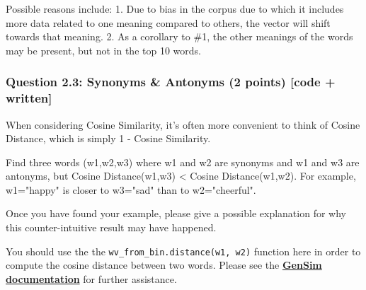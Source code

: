 \documentclass[11pt]{article}
\begin{document}
Possible reasons include: 1. Due to bias in the corpus due to which it
includes more data related to one meaning compared to others, the vector
will shift towards that meaning. 2. As a corollary to \#1, the other
meanings of the words may be present, but not in the top 10 words.

    \subsubsection{Question 2.3: Synonyms \& Antonyms (2 points) {[}code +
written{]}}\label{question-2.3-synonyms-antonyms-2-points-code-written}

When considering Cosine Similarity, it's often more convenient to think
of Cosine Distance, which is simply 1 - Cosine Similarity.

Find three words (w1,w2,w3) where w1 and w2 are synonyms and w1 and w3
are antonyms, but Cosine Distance(w1,w3) \textless{} Cosine
Distance(w1,w2). For example, w1="happy" is closer to w3="sad" than to
w2="cheerful".

Once you have found your example, please give a possible explanation for
why this counter-intuitive result may have happened.

You should use the the \texttt{wv\_from\_bin.distance(w1,\ w2)} function
here in order to compute the cosine distance between two words. Please
see the
\textbf{\href{https://radimrehurek.com/gensim/models/keyedvectors.html\#gensim.models.keyedvectors.FastTextKeyedVectors.distance}{GenSim
documentation}} for further assistance.
\end{document}
